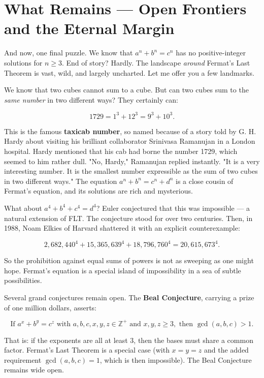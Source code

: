\bigskip


\section{What Remains --- Open Frontiers and the Eternal Margin}

And now, one final puzzle. We know that $a^n + b^n = c^n$ has no positive-integer solutions for $n \ge 3$. End of story? Hardly. The landscape \textit{around} Fermat's Last Theorem is vast, wild, and largely uncharted. Let me offer you a few landmarks.

We know that two cubes cannot sum to a cube. But can two cubes sum to the \textit{same number} in two different ways? They certainly can:

\[
1729 = 1^3 + 12^3 = 9^3 + 10^3.
\]

This is the famous \textbf{taxicab number}, so named because of a story told by G. H. Hardy about visiting his brilliant collaborator Srinivasa Ramanujan in a London hospital. Hardy mentioned that his cab had borne the number 1729, which seemed to him rather dull. "No, Hardy," Ramanujan replied instantly. "It is a very interesting number. It is the smallest number expressible as the sum of two cubes in two different ways." The equation $a^n + b^n = c^n + d^n$ is a close cousin of Fermat's equation, and its solutions are rich and mysterious.

What about $a^4 + b^4 + c^4 = d^4$? Euler conjectured that this was impossible --- a natural extension of FLT. The conjecture stood for over two centuries. Then, in 1988, Noam Elkies of Harvard shattered it with an explicit counterexample:

\[
2{,}682{,}440^4 + 15{,}365{,}639^4 + 18{,}796{,}760^4 = 20{,}615{,}673^4.
\]

So the prohibition against equal sums of powers is not as sweeping as one might hope. Fermat's equation is a special island of impossibility in a sea of subtle possibilities.

Several grand conjectures remain open. The \textbf{Beal Conjecture}, carrying a prize of one million dollars, asserts:

\[
\text{If } a^x + b^y = c^z \text{ with } a, b, c, x, y, z \in \mathbb{Z}^+ \text{ and } x, y, z \ge 3, \text{ then } \gcd(a, b, c) > 1.
\]

That is: if the exponents are all at least $3$, then the bases must share a common factor. Fermat's Last Theorem is a special case (with $x = y = z$ and the added requirement $\gcd(a,b,c) = 1$, which is then impossible). The Beal Conjecture remains wide open.

